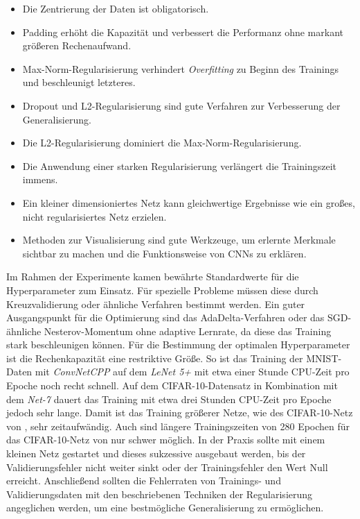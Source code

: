 \begin{itemize}
\item Die Zentrierung der Daten ist obligatorisch.
\item Padding erhöht die Kapazität und verbessert die Performanz ohne markant größeren Rechenaufwand.
\item Max-Norm-Regularisierung verhindert \textit{Overfitting} zu Beginn des Trainings und beschleunigt letzteres.
\item Dropout und L2-Regularisierung sind gute Verfahren zur Verbesserung der Generalisierung.
\item Die L2-Regularisierung dominiert die Max-Norm-Regularisierung.
\item Die Anwendung einer starken Regularisierung verlängert die Trainingszeit immens.
\item Ein kleiner dimensioniertes Netz kann gleichwertige Ergebnisse wie ein großes, nicht regularisiertes Netz erzielen.
\item Methoden zur Visualisierung sind gute Werkzeuge, um erlernte Merkmale sichtbar zu machen und die Funktionsweise von CNNs zu erklären.
\end{itemize}

Im Rahmen der Experimente kamen bewährte Standardwerte für die Hyperparameter zum Einsatz. Für spezielle Probleme müssen diese durch Kreuzvalidierung oder ähnliche Verfahren bestimmt werden. Ein guter Ausgangspunkt für die Optimierung sind das AdaDelta-Verfahren oder das SGD-ähnliche Nesterov-Momentum ohne adaptive Lernrate, da diese das Training stark beschleunigen können. 
Für die Bestimmung der optimalen Hyperparameter ist die Rechenkapazität eine restriktive Größe. So ist das Training der MNIST-Daten mit \textit{ConvNetCPP} auf dem \textit{LeNet 5+} mit etwa einer Stunde CPU-Zeit pro Epoche noch recht schnell. Auf dem CIFAR-10-Datensatz in Kombination mit dem \textit{Net-7} dauert das Training mit etwa drei Stunden CPU-Zeit pro Epoche jedoch sehr lange. Damit ist das Training größerer Netze, wie des CIFAR-10-Netz von \cite{Masci2011}, sehr zeitaufwändig. Auch sind längere Trainingszeiten von 280 Epochen für das CIFAR-10-Netz von \cite{Zeiler2013b} nur schwer möglich. 
In der Praxis sollte mit einem kleinen Netz gestartet und dieses sukzessive ausgebaut werden, bis der Validierungsfehler nicht weiter sinkt oder der Trainingsfehler den Wert Null erreicht. Anschließend sollten die Fehlerraten von Trainings- und Validierungsdaten mit den beschriebenen Techniken der Regularisierung angeglichen werden, um eine bestmögliche Generalisierung zu ermöglichen.


